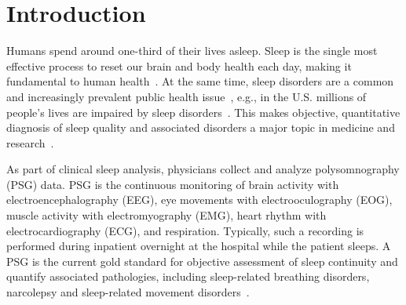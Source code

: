 \documentclass[runningheads]{llncs}
\begin{document}
\section{Introduction}
Humans spend around one-third of their lives asleep. Sleep is the single most effective process to reset our brain and body health each day, making it fundamental to human health~\cite{besedovsky2019sleep,cappuccio2017sleep}.
At the same time, sleep disorders are a common and increasingly prevalent public health issue~\cite{ohayon2011epidemiological}, e.g., in the U.S. millions of people's lives are impaired by sleep disorders~\cite{national2011national}. This makes objective, quantitative diagnosis of sleep quality and associated disorders a major topic in medicine and research~\cite{wulff2010sleep}. 

As part of clinical sleep analysis, physicians collect and analyze polysomnography (\textsc{PSG}) data. PSG is the continuous monitoring of brain activity with electroencephalography (\textsc{EEG}), eye movements with electrooculography (\textsc{EOG}), muscle activity with electromyography (\textsc{EMG}), heart rhythm with electrocardiography (\textsc{ECG}), and respiration. Typically, such a recording is performed during inpatient overnight at the hospital while the patient sleeps. A \textsc{PSG} is the current gold standard for objective assessment of sleep continuity and quantify associated pathologies, including sleep-related breathing disorders, narcolepsy and sleep-related movement disorders~\cite{penzel2000computer}. 
\end{document}
